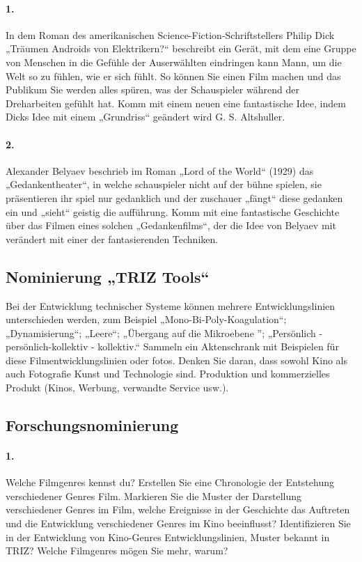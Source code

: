 \documentclass[11pt,a4paper]{article}
\begin{document}
\paragraph{1.}
In dem Roman des amerikanischen Science-Fiction-Schriftstellers Philip Dick
„Träumen Androids von Elektrikern?“ beschreibt ein Gerät, mit dem eine Gruppe
von Menschen in die Gefühle der Auserwählten eindringen kann Mann, um die Welt
so zu fühlen, wie er sich fühlt. So können Sie einen Film machen und das
Publikum Sie werden alles spüren, was der Schauspieler während der
Dreharbeiten gefühlt hat. Komm mit einem neuen eine fantastische Idee, indem
Dicks Idee mit einem „Grundriss“ geändert wird G. S. Altshuller.

\paragraph{2.}
Alexander Belyaev beschrieb im Roman „Lord of the World“ (1929) das
„Gedankentheater“, in welche schauspieler nicht auf der bühne spielen, sie
präsentieren ihr spiel nur gedanklich und der zuschauer „fängt“ diese gedanken
ein und „sieht“ geistig die aufführung. Komm mit eine fantastische Geschichte
über das Filmen eines solchen „Gedankenfilms“, der die Idee von Belyaev mit
verändert mit einer der fantasierenden Techniken.

\subsection*{Nominierung „TRIZ Tools“}

Bei der Entwicklung technischer Systeme können mehrere Entwicklungslinien
unterschieden werden, zum Beispiel „Mono-Bi-Poly-Koagulation“;
„Dynamisierung“; „Leere“; „Übergang auf die Mikroebene ”; „Persönlich -
persönlich-kollektiv - kollektiv.“ Sammeln ein Aktenschrank mit Beispielen für
diese Filmentwicklungslinien oder fotos. Denken Sie daran, dass sowohl Kino
als auch Fotografie Kunst und Technologie sind.  Produktion und kommerzielles
Produkt (Kinos, Werbung, verwandte Service usw.).

\subsection*{Forschungsnominierung}

\paragraph{1.}
Welche Filmgenres kennst du? Erstellen Sie eine Chronologie der Entstehung
verschiedener Genres Film. Markieren Sie die Muster der Darstellung
verschiedener Genres im Film, welche Ereignisse in der Geschichte das
Auftreten und die Entwicklung verschiedener Genres im Kino beeinflusst?
Identifizieren Sie in der Entwicklung von Kino-Genres Entwicklungslinien,
Muster bekannt in TRIZ? Welche Filmgenres mögen Sie mehr, warum?
\end{document}
